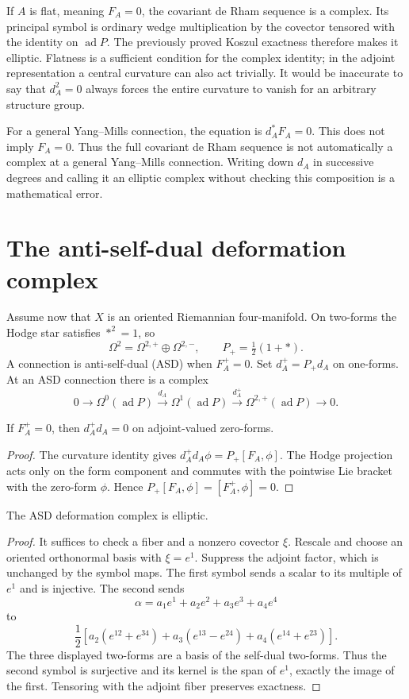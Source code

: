 If $A$ is flat, meaning $F_A=0$, the covariant de Rham sequence is a complex. Its principal symbol is ordinary wedge multiplication by the covector tensored with the identity on $\operatorname{ad}P$. The previously proved Koszul exactness therefore makes it elliptic. Flatness is a sufficient condition for the complex identity; in the adjoint representation a central curvature can also act trivially. It would be inaccurate to say that $d_A^2=0$ always forces the entire curvature to vanish for an arbitrary structure group.

For a general Yang--Mills connection, the equation is $d_A^*F_A=0$. This does not imply $F_A=0$. Thus the full covariant de Rham sequence is not automatically a complex at a general Yang--Mills connection. Writing down $d_A$ in successive degrees and calling it an elliptic complex without checking this composition is a mathematical error.

\section{The anti-self-dual deformation complex}

Assume now that $X$ is an oriented Riemannian four-manifold. On two-forms the Hodge star satisfies $*^2=1$, so
\[
\Omega^2=\Omega^{2,+}\oplus\Omega^{2,-},
\qquad P_+=\tfrac12(1+*).
\]
A connection is anti-self-dual (ASD) when $F_A^+=0$. Set $d_A^+=P_+d_A$ on one-forms. At an ASD connection there is a complex
\[
0\longrightarrow\Omega^0(\operatorname{ad}P)
 \xrightarrow{d_A}\Omega^1(\operatorname{ad}P)
 \xrightarrow{d_A^+}\Omega^{2,+}(\operatorname{ad}P)
 \longrightarrow0.
\]

\begin{proposition}
If $F_A^+=0$, then $d_A^+d_A=0$ on adjoint-valued zero-forms.
\end{proposition}
\begin{proof}
The curvature identity gives $d_A^+d_A\phi=P_+[F_A,\phi]$. The Hodge projection acts only on the form component and commutes with the pointwise Lie bracket with the zero-form $\phi$. Hence $P_+[F_A,\phi]=[F_A^+,\phi]=0$.
\end{proof}

\begin{proposition}
The ASD deformation complex is elliptic.
\end{proposition}
\begin{proof}
It suffices to check a fiber and a nonzero covector $\xi$. Rescale and choose an oriented orthonormal basis with $\xi=e^1$. Suppress the adjoint factor, which is unchanged by the symbol maps. The first symbol sends a scalar to its multiple of $e^1$ and is injective. The second sends
\[
\alpha=a_1e^1+a_2e^2+a_3e^3+a_4e^4
\]
to
\[
\frac12\left[
 a_2(e^{12}+e^{34})
 +a_3(e^{13}-e^{24})
 +a_4(e^{14}+e^{23})\right].
\]
The three displayed two-forms are a basis of the self-dual two-forms. Thus the second symbol is surjective and its kernel is the span of $e^1$, exactly the image of the first. Tensoring with the adjoint fiber preserves exactness.
\end{proof}

